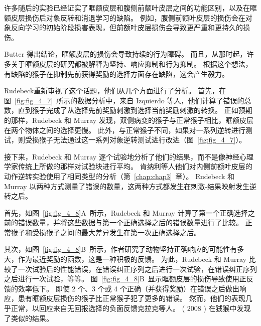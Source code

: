 许多随后的实验已经证实了眶额皮层和腹侧前额叶皮层之间的功能区别，以及在眶额皮层损伤后对象反转和消退学习的缺陷\cite{dias1997dissociable,izquierdo2004bilateral}。
例如，腹侧前额叶皮层的损伤会在对象反向学习的初始阶段损害表现，但前额叶皮层损伤会导致更严重和更持久的损伤\cite{rygula2010differential}。\par


Butter 得出结论，眶额皮层的损伤会导致持续的行为障碍。
而且，从那时起，许多关于眶额皮层的研究都被解释为坚持、响应抑制和行为抑制\cite{roberts2000inhibitory}。
根据这个想法，有缺陷的猴子在抑制先前获得奖励的选择方面存在缺陷，这会产生毅力。\par


Rudebeck\cite{rudebeck2008frontal}重新审视了这个话题，他们从几个方面进行了分析。
首先，在图~\ref{fig:fig_4_7}~所示的数据分析中，来自 Izquierdo 等人\cite{izquierdo2004bilateral}，他们计算了错误的总数，直到猴子完成了从选择先前奖励刺激到选择当前奖励刺激的转换。
正如预期的那样，Rudebeck 和 Murray 发现，双侧病变的猴子与正常猴子相比，眶额皮层在两个物体之间的选择更慢。
此外，与正常猴子不同，如果对一系列逆转进行测试，则受损猴子无法通过这一系列对象逆转测试进行改进（图~\ref{fig:fig_4_7}）。\par


接下来，Rudebeck 和 Murray 逐个试验地分析了他们的结果，而不是像神经心理学家传统上所做的那样对试验块进行平均。
肯纳利等人\cite{kennerley2006optimal}他们对内侧前额叶皮层的动作逆转实验使用了相同类型的分析（第~\ref{chap:chap3}~章）。
Rudebeck 和 Murray 以两种方式测量了错误的数量，这两种方式都发生在刺激-结果映射发生逆转之后。\par


首先，如图~\ref{fig:fig_4_8}A~所示，Rudebeck 和 Murray 计算了第一个正确选择之前的错误数量，并将这些数据与第一个正确选择之后的错误数量进行了比较。
正常猴子和受损猴子之间的最大差异发生在第一次正确选择之后。\par


其次，如图~\ref{fig:fig_4_8}B~所示，作者研究了动物坚持正确响应的可能性有多大，作为最近奖励的函数，这是一种积极的反馈。
为此，Rudebeck 和 Murray 比较了一次试验后的性能错误，在错误纠正序列之后进行一次试验，在错误纠正序列之后进行一次试验，等等。
图~\ref{fig:fig_4_8}B~显示眶额皮层的损伤导致使用正反馈的效率低下。
即使 2 个、3 个或 4 个正确（并获得奖励）在错误之后做出响应，患有眶额皮层损伤的猴子比正常猴子犯了更多的错误。
然而，他们的表现几乎正常，以回应来自无回报选择的负面反馈\cite{rudebeck2008frontal}克拉克等人。
( 2008 ) 在狨猴中发现了类似的结果。\par


